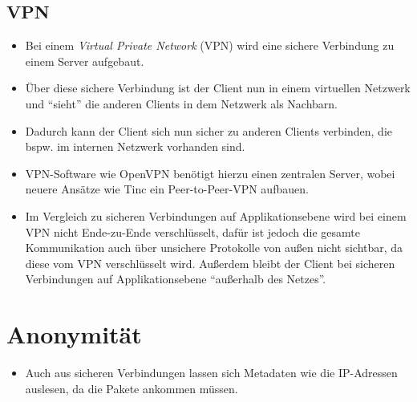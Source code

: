 \documentclass[a4paper, 11pt, accentcolor = tud3b]{tudreport}
\begin{document}
            \subsection{VPN}
                \begin{itemize}
                	\item Bei einem \textit{Virtual Private Network} (VPN) wird eine sichere Verbindung zu einem Server aufgebaut.
                	\item Über diese sichere Verbindung ist der Client nun in einem virtuellen Netzwerk und \enquote{sieht} die anderen Clients in dem Netzwerk als Nachbarn.
                	\item Dadurch kann der Client sich nun sicher zu anderen Clients verbinden, die bspw. im internen Netzwerk vorhanden sind.
                	\item VPN-Software wie OpenVPN benötigt hierzu einen zentralen Server, wobei neuere Ansätze wie Tinc ein Peer-to-Peer-VPN aufbauen.
                	\item Im Vergleich zu sicheren Verbindungen auf Applikationsebene wird bei einem VPN nicht Ende-zu-Ende verschlüsselt, dafür ist jedoch die gesamte Kommunikation auch über unsichere Protokolle von außen nicht sichtbar, da diese vom VPN verschlüsselt wird. Außerdem bleibt der Client bei sicheren Verbindungen auf Applikationsebene \enquote{außerhalb des Netzes}.
                \end{itemize}

        \section{Anonymität} %
            \begin{itemize}
            	\item Auch aus sicheren Verbindungen lassen sich Metadaten wie die IP-Adressen auslesen, da die Pakete ankommen müssen.
            \end{itemize}
\end{document}
